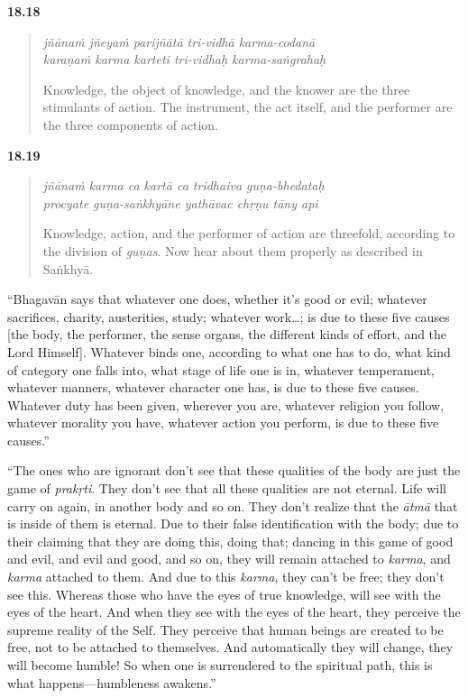 \par\noindent\textbf{18.18}\par
\begin{verse}
\textit{jñānaṁ jñeyaṁ parijñātā tri-vidhā karma-codanā} \\
\textit{karaṇaṁ karma karteti tri-vidhaḥ karma-saṅgrahaḥ}

\noindent Knowledge, the object of knowledge, and the knower are the three stimulants of action. The instrument, the act itself, and the performer are the three components of action.
\end{verse}
\par



\par\noindent\textbf{18.19}\par
\begin{verse}
\textit{jñānaṁ karma ca kartā ca tridhaiva guṇa-bhedataḥ} \\
\textit{procyate guṇa-saṅkhyāne yathāvac chṛṇu tāny api}

\noindent Knowledge, action, and the performer of action are threefold, according to the division of \textit{guṇas}. Now hear about them properly as described in Saṅkhyā.
\end{verse}
\par


\enquote{Bhagavān says that whatever one does, whether it’s good or evil; whatever sacrifices, charity, austerities, study; whatever work\ldots; is due to these five causes [the body, the performer, the sense organs, the different kinds of effort, and the Lord Himself]. Whatever binds one, according to what one has to do, what kind of category one falls into, what stage of life one is in, whatever temperament, whatever manners, whatever character one has, is due to these five causes. Whatever duty has been given, wherever you are, whatever religion you follow, whatever morality you have, whatever action you perform, is due to these five causes.}

\enquote{The ones who are ignorant don’t see that these qualities of the body are just the game of \textit{prakṛti}. They don’t see that all these qualities are not eternal. Life will carry on again, in another body and so on. They don’t realize that the \textit{ātmā} that is inside of them is eternal. Due to their false identification with the body; due to their claiming that they are doing this, doing that; dancing in this game of good and evil, and evil and good, and so on, they will remain attached to \textit{karma}, and \textit{karma} attached to them. And due to this \textit{karma}, they can’t be free; they don’t see this. Whereas those who have the eyes of true knowledge, will see with the eyes of the heart. And when they see with the eyes of the heart, they perceive the supreme reality of the Self. They perceive that human beings are created to be free, not to be attached to themselves. And automatically they will change, they will become humble! So when one is surrendered to the spiritual path, this is what happens---humbleness awakens.}


